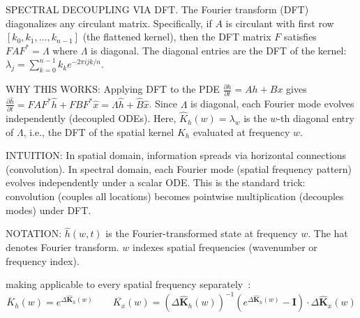 \begin{ThomasAnnotation}
  SPECTRAL DECOUPLING VIA DFT. The Fourier transform (DFT) diagonalizes any circulant matrix. Specifically, if $A$ is circulant with first row $[k_0, k_1, \ldots, k_{n-1}]$ (the flattened kernel), then the DFT matrix $F$ satisfies $F A F^* = \Lambda$ where $\Lambda$ is diagonal. The diagonal entries are the DFT of the kernel: $\lambda_j = \sum_{k=0}^{n-1} k_k e^{-2\pi i jk/n}$.
  
  WHY THIS WORKS: Applying DFT to the PDE $\frac{\partial h}{\partial t} = Ah + Bx$ gives $\frac{\partial \widehat{h}}{\partial t} = F A F^* \widehat{h} + F B F^* \widehat{x} = \Lambda \widehat{h} + \widehat{B} \widehat{x}$. Since $\Lambda$ is diagonal, each Fourier mode evolves independently (decoupled ODEs). Here, $\widehat{K}_h(w) = \lambda_w$ is the $w$-th diagonal entry of $\Lambda$, i.e., the DFT of the spatial kernel $K_h$ evaluated at frequency $w$.
  
  INTUITION: In spatial domain, information spreads via horizontal connections (convolution). In spectral domain, each Fourier mode (spatial frequency pattern) evolves independently under a scalar ODE. This is the standard trick: convolution (couples all locations) becomes pointwise multiplication (decouples modes) under DFT.
  
  NOTATION: $\widehat{h}(w,t)$ is the Fourier-transformed state at frequency $w$. The hat denotes Fourier transform. $w$ indexes spatial frequencies (wavenumber or frequency index).
\end{ThomasAnnotation}

making  applicable to every spatial frequency separately~:
\begin{equation}
\label{eq:zoh_spectral}
\overline{K}_h(w) = e^{\Delta \bm{\widehat{K}}_h(w)}
\qquad
\overline{K_x}(w) = (\Delta \bm{\widehat{K}}_h(w))^{-1} (e^{\Delta \bm{\widehat{K}}_h(w)} - \bm{I}) \cdot \Delta \bm{\widehat{K}}_x(w)
\end{equation}

